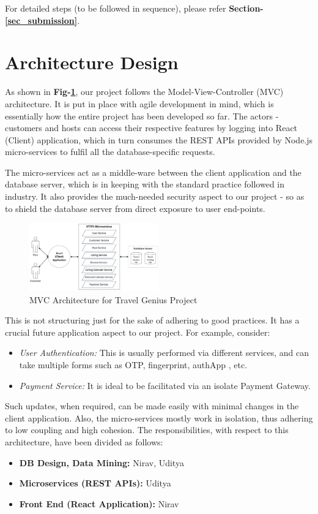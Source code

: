 \documentclass[conference]{IEEEtran}
\begin{document}
For detailed steps (to be followed in sequence), please refer \textbf{Section-\ref{sec_submission}}.


\section{\textbf{Architecture Design}}
    As shown in \textbf{Fig-\ref{fig_1}}, our project follows the Model-View-Controller (MVC) architecture. It is put in place with agile development in mind, which is essentially how the entire project has been developed so far. The actors - customers and hosts can access their respective features by logging into React (Client) application, which in turn consumes the REST APIs provided by Node.js micro-services to fulfil all the database-specific requests.

    The micro-services act as a middle-ware between the client application and the database server, which is in keeping with the standard practice followed in industry. It also provides the much-needed security aspect to our project - so as to shield the database server from direct exposure to user end-points.

    \begin{figure}[h!]
        \centering
		\includegraphics[width=0.5\textwidth]{../Architecture/Architecture.JPG}
		\caption{MVC Architecture for Travel Genius Project} \label{fig_1}
	\end{figure}

    This is not structuring just for the sake of adhering to good practices. It has a crucial future application aspect to our project. For example, consider:
    \begin{itemize}
        \item \textit{User Authentication:}  This is usually performed via different services, and can take multiple forms such as OTP, fingerprint, authApp , etc.
        \item \textit{Payment Service:} It is ideal to be facilitated via an isolate Payment Gateway.
    \end{itemize}
    
    Such updates, when required, can be made easily with minimal changes in the client application. Also, the micro-services mostly work in isolation, thus adhering to low coupling and high cohesion. The responsibilities, with respect to this architecture, have been divided as follows:
    \begin{itemize}
        \item {\textbf{DB Design, Data Mining:}  Nirav, Uditya}
        \item {\textbf{Microservices (REST APIs):} Uditya}
        \item {\textbf{Front End (React Application):} Nirav}
    \end{itemize}
 
\end{document}
